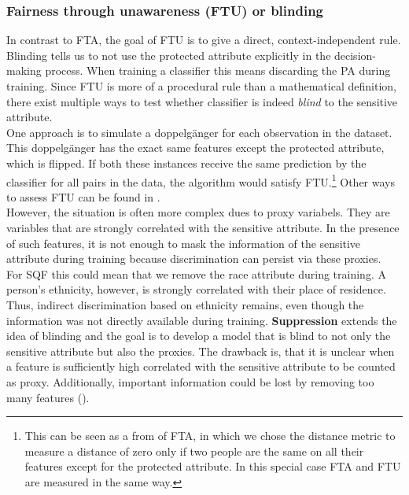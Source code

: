\subsubsection*{Fairness through unawareness (FTU) or blinding}
In contrast to FTA, the goal of FTU is to give a direct, context-independent rule. Blinding tells us to not use the protected attribute explicitly in the decision-making process. When training a classifier this means discarding the PA during training.
Since FTU is more of a procedural rule than a mathematical definition, there exist multiple ways to test whether classifier is indeed \textit{blind} to the sensitive attribute. \\
One approach is to simulate a doppelgänger for each observation in the dataset. This doppelgänger has the exact same features except the protected attribute, which is flipped.
If both these instances receive the same prediction by the classifier for all pairs in the data, the algorithm would satisfy FTU.\footnote{This can be seen as a from of FTA, in which we chose the distance metric to measure a distance of zero only if two people are the same on all their features except for the protected attribute. In this special case FTA and FTU are measured in the same way.} Other ways to assess FTU can be found in \cite{verma2018}.\\
However, the situation is often more complex dues to proxy variabels. They are variables that are strongly correlated with the sensitive attribute. In the presence of such features, it is not enough to mask the information of the sensitive attribute during training because discrimination can persist via these proxies.\\
For SQF this could mean that we remove the race attribute during training.
A person's ethnicity, however, is strongly correlated with their place of residence. Thus, indirect discrimination based on ethnicity remains, even though the information was not directly available during training.
\textbf{Suppression} extends the idea of blinding and the goal is to develop a model that is blind to not only the sensitive attribute but also the proxies. The drawback is, that it is unclear when a feature is sufficiently high correlated with the sensitive attribute to be counted as proxy. Additionally, important information could be lost by removing too many features (\cite{castelnovo2022}).


